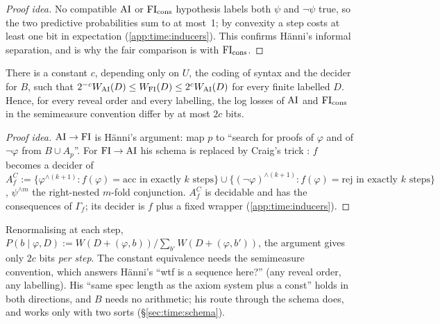 \begin{proof}[Proof idea]
No compatible $\mathrm{AI}$ or $\mathrm{FI}_{\mathrm{cons}}$ hypothesis labels both $\psi$ and $\neg\psi$ true, so the two predictive probabilities sum to at most~1; by convexity a step costs at least one bit in expectation (\cref{app:time:inducers}). This confirms H\"anni's informal separation, and is why the fair comparison is with $\mathrm{FI}_{\mathrm{cons}}$.
\end{proof}

\begin{theorem}\label{thm:time:equiv}
There is a constant $c$, depending only on $U$, the coding of syntax and the decider for $B$, such that $2^{-c}W_{\mathrm{AI}}(D)\le W_{\mathrm{FI}}(D)\le2^{c}W_{\mathrm{AI}}(D)$ for every finite labelled $D$. Hence, for every reveal order and every labelling, the log losses of $\mathrm{AI}$ and $\mathrm{FI}_{\mathrm{cons}}$ in the semimeasure convention differ by at most $2c$ bits.
\end{theorem}

\begin{proof}[Proof idea]
$\mathrm{AI}\to\mathrm{FI}$ is H\"anni's argument: map $p$ to ``search for proofs of $\varphi$ and of $\neg\varphi$ from $B\cup A_p$''. For $\mathrm{FI}\to\mathrm{AI}$ his schema is replaced by Craig's trick \citep{craig1953axiomatizability}: $f$ becomes a decider of
$A^C_f:=\{\varphi^{\wedge(k+1)}:f(\varphi)=\mathrm{acc}\text{ in exactly }k\text{ steps}\}\cup\{(\neg\varphi)^{\wedge(k+1)}:f(\varphi)=\mathrm{rej}\text{ in exactly }k\text{ steps}\}$, $\psi^{\wedge m}$ the right-nested $m$-fold conjunction. $A^C_f$ is decidable and has the consequences of $\Gamma_f$; its decider is $f$ plus a fixed wrapper (\cref{app:time:inducers}).
\end{proof}

\begin{remark}\label{rem:time:convention}
Renormalising at each step, $P(b\mid\varphi,D):=W(D+(\varphi,b))/\sum_{b'}W(D+(\varphi,b'))$, the argument gives only $2c$ bits \emph{per step}. The constant equivalence needs the semimeasure convention, which answers H\"anni's ``wtf is a sequence here?'' (any reveal order, any labelling). His ``same spec length as the axiom system plus a const'' holds in both directions, and $B$ needs no arithmetic; his route through the schema does, and works only with two sorts (\S\ref{sec:time:schema}).
\end{remark}

